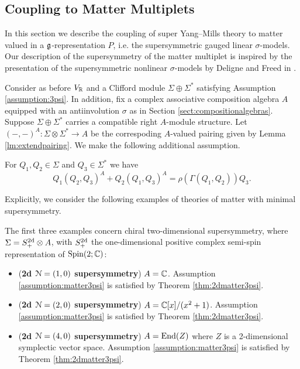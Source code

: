 \documentclass[10pt, oneside]{article}
\begin{document}
\subsection{Coupling to Matter Multiplets}
\label{sect:mattermultipletSUSY}

In this section we describe the coupling of super Yang--Mills theory to matter valued in a $\mathfrak g$-representation $P$, i.e. the supersymmetric gauged linear $\sigma$-models. Our description of the supersymmetry of the matter multiplet is inspired by the presentation of the supersymmetric nonlinear $\sigma$-models by Deligne and Freed in \cite[Chapter 3]{DeligneFreed}.

Consider as before $V_\mathbb R$ and a Clifford module $\Sigma\oplus \Sigma^*$ satisfying Assumption \ref{assumption:3psi}. In addition, fix a complex associative composition algebra $A$ equipped with an antiinvolution $\sigma$ as in Section \ref{sect:compositionalgebras}. Suppose $\Sigma\oplus \Sigma^*$ carries a compatible right $A$-module structure. Let $(-, -)^A\colon \Sigma\otimes \Sigma^*\rightarrow A$ be the correspoding $A$-valued pairing given by Lemma \ref{lm:extendpairing}. We make the following additional assumption.

\begin{assumption}
For $Q_1, Q_2\in\Sigma$ and $Q_3\in\Sigma^*$ we have
\[Q_1(Q_2, Q_3)^A + Q_2(Q_1, Q_3)^A = \rho(\Gamma(Q_1, Q_2))Q_3.\]
\label{assumption:matter3psi}
\end{assumption}

Explicitly, we consider the following examples of theories of matter with minimal supersymmetry. 

The first three examples concern chiral two-dimensional supersymmetry, where $\Sigma = S^{2 \rm d}_+ \otimes A$, with $S_+^{2 \rm d}$ the one-dimensional positive complex semi-spin representation of $\mathrm{Spin}(2;\mathbb C)$:

\begin{itemize}
\item (\textbf{2d $\mathcal N=(1, 0)$ supersymmetry}) $A = \mathbb C$. Assumption \ref{assumption:matter3psi} is satisfied by Theorem \ref{thm:2dmatter3psi}.

\item (\textbf{2d $\mathcal N=(2, 0)$ supersymmetry}) $A = \mathbb C[x]/(x^2+1)$. Assumption \ref{assumption:matter3psi} is satisfied by Theorem \ref{thm:2dmatter3psi}.

\item (\textbf{2d $\mathcal N=(4, 0)$ supersymmetry}) $A = \operatorname{End}(Z)$ where $Z$ is a 2-dimensional symplectic vector space. Assumption \ref{assumption:matter3psi} is satisfied by Theorem \ref{thm:2dmatter3psi}.
\end{itemize}
\end{document}
